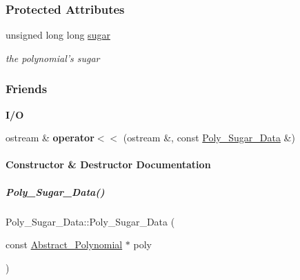 \subsubsection*{Protected Attributes}
\begin{DoxyCompactItemize}
\item 
\mbox{\label{group__strategygroup_a125902ea0a800d9545937930e4537040}} 
unsigned long long \hyperlink{group__strategygroup_a125902ea0a800d9545937930e4537040}{sugar}
\begin{DoxyCompactList}\small\item\em the polynomial's sugar \end{DoxyCompactList}\end{DoxyCompactItemize}
\subsubsection*{Friends}
\begin{Indent}\textbf{ I/O}\par
\begin{DoxyCompactItemize}
\item 
\mbox{\label{group__strategygroup_ade466c9119513ef40b2b6220a98a72e6}} 
ostream \& {\bfseries operator$<$$<$} (ostream \&, const \hyperlink{group__strategygroup_class_poly___sugar___data}{Poly\+\_\+\+Sugar\+\_\+\+Data} \&)
\end{DoxyCompactItemize}
\end{Indent}


\paragraph{Constructor \& Destructor Documentation}
\mbox{\label{group__strategygroup_a0d9e2f66a44f2e10d26b977c55650f7f}} 
\subparagraph{\texorpdfstring{Poly\+\_\+\+Sugar\+\_\+\+Data()}{Poly\_Sugar\_Data()}}
{\footnotesize\ttfamily Poly\+\_\+\+Sugar\+\_\+\+Data\+::\+Poly\+\_\+\+Sugar\+\_\+\+Data (\begin{DoxyParamCaption}\item[{const \hyperlink{group__polygroup_class_abstract___polynomial}{Abstract\+\_\+\+Polynomial} $\ast$}]{poly }\end{DoxyParamCaption})\hspace{0.3cm}{\ttfamily [explicit]}}



